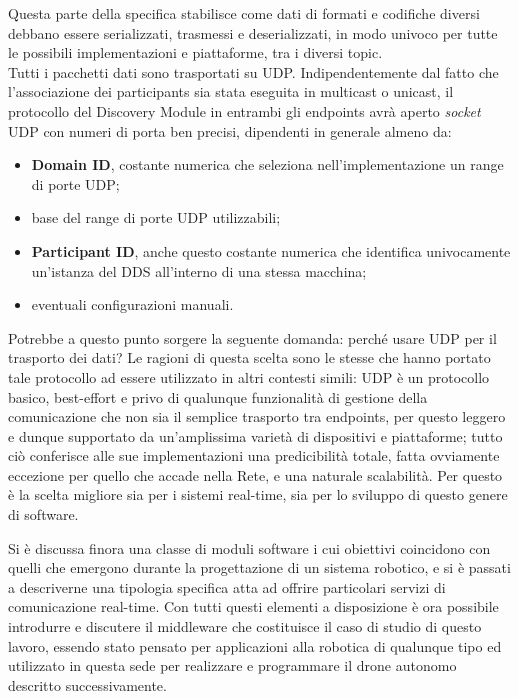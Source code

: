 \indent Questa parte della specifica stabilisce come dati di formati e codifiche diversi debbano essere serializzati, trasmessi e deserializzati, in modo univoco per tutte le possibili implementazioni e piattaforme, tra i diversi topic.\\
Tutti i pacchetti dati sono trasportati su UDP. Indipendentemente dal fatto che l’associazione dei participants sia stata eseguita in multicast o unicast, il protocollo del Discovery Module in entrambi gli endpoints avrà aperto \emph{socket} UDP con numeri di porta ben precisi, dipendenti in generale almeno da:
\begin{itemize}
    \item \textbf{Domain ID}, costante numerica che seleziona nell'implementazione un range di porte UDP;
    \item base del range di porte UDP utilizzabili;
    \item \textbf{Participant ID}, anche questo costante numerica che identifica univocamente un'istanza del DDS all'interno di una stessa macchina;
    \item eventuali configurazioni manuali.
\end{itemize}
Potrebbe a questo punto sorgere la seguente domanda: perché usare UDP per il trasporto dei dati? Le ragioni di questa scelta sono le stesse che hanno portato tale protocollo ad essere utilizzato in altri contesti simili: UDP è un protocollo basico, best-effort e privo di qualunque funzionalità di gestione della comunicazione che non sia il semplice trasporto tra endpoints, per questo leggero e dunque supportato da un'amplissima varietà di dispositivi e piattaforme; tutto ciò conferisce alle sue implementazioni una predicibilità totale, fatta ovviamente eccezione per quello che accade nella Rete, e una naturale scalabilità. Per questo è la scelta migliore sia per i sistemi real-time, sia per lo sviluppo di questo genere di software.\newpage

\indent Si è discussa finora una classe di moduli software i cui obiettivi coincidono con quelli che emergono durante la progettazione di un sistema robotico, e si è passati a descriverne una tipologia specifica atta ad offrire particolari servizi di comunicazione real-time. Con tutti questi elementi a disposizione è ora possibile introdurre e discutere il middleware che costituisce il caso di studio di questo lavoro, essendo stato pensato per applicazioni alla robotica di qualunque tipo ed utilizzato in questa sede per realizzare e programmare il drone autonomo descritto successivamente.
